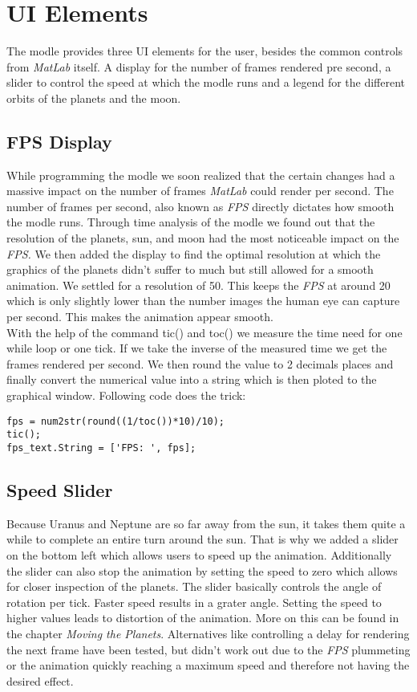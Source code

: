 \chapter{UI Elements}

The modle provides three UI elements for the user, besides the common controls from {\em MatLab} itself. A display for the number of frames rendered pre second, a slider to control the speed at which the modle runs and a legend for the different orbits of the planets and the moon.

\section{FPS Display}
While programming the modle we soon realized that the certain changes had a massive impact on the number of frames {\em MatLab} could render per second. The number of frames per second, also known as {\em FPS} directly dictates how smooth the modle runs. Through time analysis of the modle we found out that the resolution of the planets, sun, and moon had the most noticeable impact on the {\em FPS.} We then added the display to find the optimal resolution at which the graphics of the planets didn't suffer to much but still allowed for a smooth animation. We settled for a resolution of 50. This keeps the {\em FPS} at around 20 which is only slightly lower than the number images the human eye can capture per second. This makes the animation appear smooth.\\

With the help of the command tic() and toc() we measure the time need for one while loop or one tick. If we take the inverse of the measured time we get the frames rendered per second. We then round the value to 2 decimals places and finally convert the numerical value into a string which is then ploted to the graphical window. Following code does the trick:

\begin{framed}\begin{verbatim}
fps = num2str(round((1/toc())*10)/10);
tic();
fps_text.String = ['FPS: ', fps];
\end{verbatim}\end{framed}


\section{Speed Slider}
Because Uranus and Neptune are so far away from the sun, it takes them quite a while to complete an entire turn around the sun. That is why we added a slider on the bottom left which allows users to speed up the animation. Additionally the slider can also stop the animation by setting the speed to zero which allows for closer inspection of the planets. The slider basically controls the angle of rotation per tick. Faster speed results in a grater angle. Setting the speed to higher values leads to distortion of the animation. More on this can be found in the chapter {\em Moving the Planets}. Alternatives like controlling a delay for rendering the next frame have been tested, but didn't work out due to the {\em FPS} plummeting or the animation quickly reaching a maximum speed and therefore not having the desired effect.

